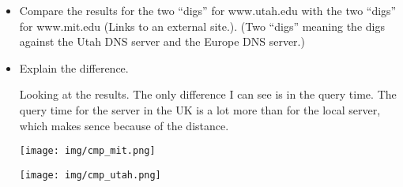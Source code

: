 \documentclass[11pt]{article}
\begin{document}
\begin{itemize}
\item Compare the results for the two ``digs'' for www.utah.edu with the two ``digs'' for www.mit.edu (Links to an external site.). (Two ``digs'' meaning the digs against the Utah DNS server and the Europe DNS server.)

\item Explain the difference.

Looking at the results. The only difference I can see is in the query time. The query time for the server in the UK is a lot more than for the local server, which makes sence because of the distance.

\texttt{[image: img/cmp\_mit.png]}


\texttt{[image: img/cmp\_utah.png]}


\end{itemize}
\end{document}
